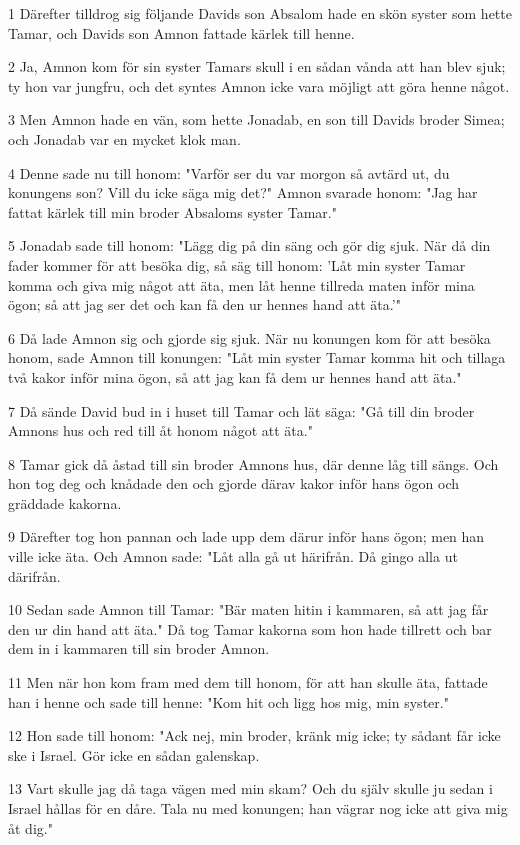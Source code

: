 \par 1 Därefter tilldrog sig följande Davids son Absalom hade en skön syster som hette Tamar, och Davids son Amnon fattade kärlek till henne.
\par 2 Ja, Amnon kom för sin syster Tamars skull i en sådan vånda att han blev sjuk; ty hon var jungfru, och det syntes Amnon icke vara möjligt att göra henne något.
\par 3 Men Amnon hade en vän, som hette Jonadab, en son till Davids broder Simea; och Jonadab var en mycket klok man.
\par 4 Denne sade nu till honom: "Varför ser du var morgon så avtärd ut, du konungens son? Vill du icke säga mig det?" Amnon svarade honom: "Jag har fattat kärlek till min broder Absaloms syster Tamar."
\par 5 Jonadab sade till honom: "Lägg dig på din säng och gör dig sjuk. När då din fader kommer för att besöka dig, så säg till honom: 'Låt min syster Tamar komma och giva mig något att äta, men låt henne tillreda maten inför mina ögon; så att jag ser det och kan få den ur hennes hand att äta.'"
\par 6 Då lade Amnon sig och gjorde sig sjuk. När nu konungen kom för att besöka honom, sade Amnon till konungen: "Låt min syster Tamar komma hit och tillaga två kakor inför mina ögon, så att jag kan få dem ur hennes hand att äta."
\par 7 Då sände David bud in i huset till Tamar och lät säga: "Gå till din broder Amnons hus och red till åt honom något att äta."
\par 8 Tamar gick då åstad till sin broder Amnons hus, där denne låg till sängs. Och hon tog deg och knådade den och gjorde därav kakor inför hans ögon och gräddade kakorna.
\par 9 Därefter tog hon pannan och lade upp dem därur inför hans ögon; men han ville icke äta. Och Amnon sade: "Låt alla gå ut härifrån. Då gingo alla ut därifrån.
\par 10 Sedan sade Amnon till Tamar: "Bär maten hitin i kammaren, så att jag får den ur din hand att äta." Då tog Tamar kakorna som hon hade tillrett och bar dem in i kammaren till sin broder Amnon.
\par 11 Men när hon kom fram med dem till honom, för att han skulle äta, fattade han i henne och sade till henne: "Kom hit och ligg hos mig, min syster."
\par 12 Hon sade till honom: "Ack nej, min broder, kränk mig icke; ty sådant får icke ske i Israel. Gör icke en sådan galenskap.
\par 13 Vart skulle jag då taga vägen med min skam? Och du själv skulle ju sedan i Israel hållas för en dåre. Tala nu med konungen; han vägrar nog icke att giva mig åt dig."
